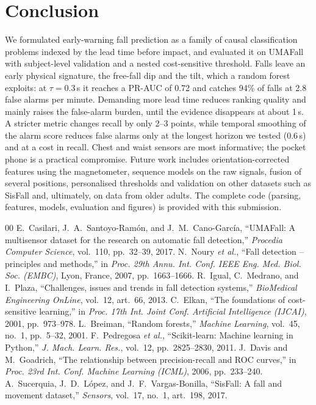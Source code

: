 \documentclass[conference]{IEEEtran}
\begin{document}
\section{Conclusion}
We formulated early-warning fall prediction as a family of causal classification problems indexed by the lead time before impact, and evaluated it on UMAFall with subject-level validation and a nested cost-sensitive threshold. Falls leave an early physical signature, the free-fall dip and the tilt, which a random forest exploits: at $\tau=0.3$\,s it reaches a PR-AUC of 0.72 and catches 94\% of falls at 2.8 false alarms per minute. Demanding more lead time reduces ranking quality and mainly raises the false-alarm burden, until the evidence disappears at about 1\,s. A stricter metric changes recall by only 2--3 points, while temporal smoothing of the alarm score reduces false alarms only at the longest horizon we tested (0.6\,s) and at a cost in recall. Chest and waist sensors are most informative; the pocket phone is a practical compromise. Future work includes orientation-corrected features using the magnetometer, sequence models on the raw signals, fusion of several positions, personalised thresholds and validation on other datasets such as SisFall \cite{sucerquia2017} and, ultimately, on data from older adults. The complete code (parsing, features, models, evaluation and figures) is provided with this submission.

\begin{thebibliography}{00}
 E.~Casilari, J.~A.~Santoyo-Ram\'on, and J.~M.~Cano-Garc\'ia, ``UMAFall: A multisensor dataset for the research on automatic fall detection,'' \emph{Procedia Computer Science}, vol.~110, pp.~32--39, 2017.
 N.~Noury \emph{et al.}, ``Fall detection -- principles and methods,'' in \emph{Proc. 29th Annu. Int. Conf. IEEE Eng. Med. Biol. Soc. (EMBC)}, Lyon, France, 2007, pp.~1663--1666.
 R.~Igual, C.~Medrano, and I.~Plaza, ``Challenges, issues and trends in fall detection systems,'' \emph{BioMedical Engineering OnLine}, vol.~12, art.~66, 2013.
 C.~Elkan, ``The foundations of cost-sensitive learning,'' in \emph{Proc. 17th Int. Joint Conf. Artificial Intelligence (IJCAI)}, 2001, pp.~973--978.
 L.~Breiman, ``Random forests,'' \emph{Machine Learning}, vol.~45, no.~1, pp.~5--32, 2001.
 F.~Pedregosa \emph{et al.}, ``Scikit-learn: Machine learning in Python,'' \emph{J. Mach. Learn. Res.}, vol.~12, pp.~2825--2830, 2011.
 J.~Davis and M.~Goadrich, ``The relationship between precision-recall and ROC curves,'' in \emph{Proc. 23rd Int. Conf. Machine Learning (ICML)}, 2006, pp.~233--240.
 A.~Sucerquia, J.~D.~L\'opez, and J.~F.~Vargas-Bonilla, ``SisFall: A fall and movement dataset,'' \emph{Sensors}, vol.~17, no.~1, art.~198, 2017.
\end{thebibliography}
\end{document}
